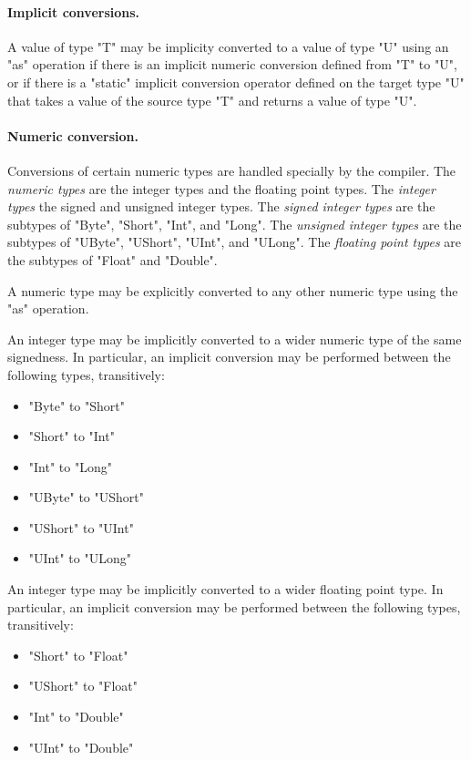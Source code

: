 \paragraph{Implicit conversions.}

A value of type \xcd"T" may be implicity converted to a value of type
\xcd"U" using an \xcd"as" operation if there is an implicit numeric conversion defined
from \xcd"T" to \xcd"U",
or if there is a \xcd"static" implicit conversion operator defined
on the target type \xcd"U" that takes a value of the source type
\xcd"T" and returns a value of type \xcd"U".

\paragraph{Numeric conversion.}


Conversions of certain numeric types are handled specially by the
compiler.
The \emph{numeric types} are the integer types and the floating
point types.
The \emph{integer types} the signed and unsigned integer types.
The \emph{signed integer types} are the subtypes of
\xcd"Byte", \xcd"Short", \xcd"Int", and \xcd"Long".
The \emph{unsigned integer types} are the subtypes of
\xcd"UByte", \xcd"UShort", \xcd"UInt", and \xcd"ULong".
The \emph{floating point types} are the subtypes of
\xcd"Float" and \xcd"Double".

A numeric type may be explicitly converted to any other numeric
type using the \xcd"as" operation.

An integer type may be implicitly converted to a wider numeric
type of the same signedness.
In particular, an implicit conversion may be performed between
the following types, transitively:
\begin{itemize}
\item \xcd"Byte" to \xcd"Short"
\item \xcd"Short" to \xcd"Int"
\item \xcd"Int" to \xcd"Long"
\item \xcd"UByte" to \xcd"UShort"
\item \xcd"UShort" to \xcd"UInt"
\item \xcd"UInt" to \xcd"ULong"
\end{itemize}

An integer type may be implicitly converted to a wider floating point
type.  
In particular, an implicit conversion may be performed between
the following types, transitively:
\begin{itemize}
\item \xcd"Short" to \xcd"Float"
\item \xcd"UShort" to \xcd"Float"
\item \xcd"Int" to \xcd"Double"
\item \xcd"UInt" to \xcd"Double"
\end{itemize}

